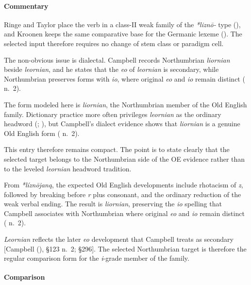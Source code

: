 \documentclass[
  british,
  a4paper,
]{article}
\begin{document}
\paragraph{Commentary}\label{commentary-7}

Ringe and Taylor place the verb in a class-II weak family of the
\emph{*liznō-} type (), and Kroonen keeps the same comparative base for the Germanic
lexeme (). The selected input
therefore requires no change of stem class or paradigm cell.

The non-obvious issue is dialectal. Campbell records Northumbrian
\emph{liornian} beside \emph{leornian}, and he states that the \emph{eo}
of \emph{leornian} is secondary, while Northumbrian preserves forms with
\emph{io}, where original \emph{eo} and \emph{io} remain distinct
( n.~2).

The form modeled here is \emph{liornian}, the Northumbrian member of the
Old English family. Dictionary practice more often privileges
\emph{leornian} as the ordinary headword
(;
), but Campbell's
dialect evidence shows that \emph{liornian} is a genuine Old English
form ( n.~2).

This entry therefore remains compact. The point is to state clearly that
the selected target belongs to the Northumbrian side of the OE evidence
rather than to the leveled \emph{leornian} headword tradition.

From \emph{*líznōjaną}, the expected Old English developments include
rhotacism of \emph{z}, followed by breaking before \emph{r} plus
consonant, and the ordinary reduction of the weak verbal ending. The
result is \emph{liornian}, preserving the \emph{io} spelling that
Campbell associates with Northumbrian where original \emph{eo} and
\emph{io} remain distinct ( n.~2).

\emph{Leornian} reflects the later \emph{eo} development that Campbell
treats as secondary {[}Campbell (),
§123 n.~2; §296{]}. The selected Northumbrian target is therefore the
regular comparison form for the \emph{i}-grade member of the family.

\paragraph{Comparison}\label{comparison-1}
\end{document}
